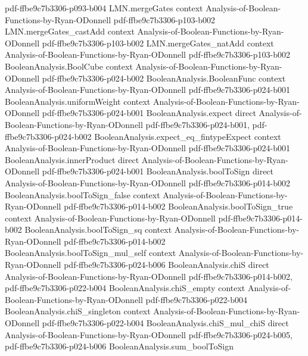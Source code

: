\begin{theorem}
  {pdf-ffbe9c7b3306-p093-b004}
\proofstep
  {LMN.mergeGates}
  {context}
  {Analysis-of-Boolean-Functions-by-Ryan-ODonnell}
  {pdf-ffbe9c7b3306-p103-b002}
\proofstep
  {LMN.mergeGates_castAdd}
  {context}
  {Analysis-of-Boolean-Functions-by-Ryan-ODonnell}
  {pdf-ffbe9c7b3306-p103-b002}
\proofstep
  {LMN.mergeGates_natAdd}
  {context}
  {Analysis-of-Boolean-Functions-by-Ryan-ODonnell}
  {pdf-ffbe9c7b3306-p103-b002}
\proofstep
  {BooleanAnalysis.BoolCube}
  {context}
  {Analysis-of-Boolean-Functions-by-Ryan-ODonnell}
  {pdf-ffbe9c7b3306-p024-b002}
\proofstep
  {BooleanAnalysis.BooleanFunc}
  {context}
  {Analysis-of-Boolean-Functions-by-Ryan-ODonnell}
  {pdf-ffbe9c7b3306-p024-b001}
\proofstep
  {BooleanAnalysis.uniformWeight}
  {context}
  {Analysis-of-Boolean-Functions-by-Ryan-ODonnell}
  {pdf-ffbe9c7b3306-p024-b001}
\proofstep
  {BooleanAnalysis.expect}
  {direct}
  {Analysis-of-Boolean-Functions-by-Ryan-ODonnell}
  {pdf-ffbe9c7b3306-p024-b001,
    pdf-ffbe9c7b3306-p024-b002}
\proofstep
  {BooleanAnalysis.expect_eq_fintypeExpect}
  {context}
  {Analysis-of-Boolean-Functions-by-Ryan-ODonnell}
  {pdf-ffbe9c7b3306-p024-b001}
\proofstep
  {BooleanAnalysis.innerProduct}
  {direct}
  {Analysis-of-Boolean-Functions-by-Ryan-ODonnell}
  {pdf-ffbe9c7b3306-p024-b001}
\proofstep
  {BooleanAnalysis.boolToSign}
  {direct}
  {Analysis-of-Boolean-Functions-by-Ryan-ODonnell}
  {pdf-ffbe9c7b3306-p014-b002}
\proofstep
  {BooleanAnalysis.boolToSign_false}
  {context}
  {Analysis-of-Boolean-Functions-by-Ryan-ODonnell}
  {pdf-ffbe9c7b3306-p014-b002}
\proofstep
  {BooleanAnalysis.boolToSign_true}
  {context}
  {Analysis-of-Boolean-Functions-by-Ryan-ODonnell}
  {pdf-ffbe9c7b3306-p014-b002}
\proofstep
  {BooleanAnalysis.boolToSign_sq}
  {context}
  {Analysis-of-Boolean-Functions-by-Ryan-ODonnell}
  {pdf-ffbe9c7b3306-p014-b002}
\proofstep
  {BooleanAnalysis.boolToSign_mul_self}
  {context}
  {Analysis-of-Boolean-Functions-by-Ryan-ODonnell}
  {pdf-ffbe9c7b3306-p024-b006}
\proofstep
  {BooleanAnalysis.chiS}
  {direct}
  {Analysis-of-Boolean-Functions-by-Ryan-ODonnell}
  {pdf-ffbe9c7b3306-p014-b002,
    pdf-ffbe9c7b3306-p022-b004}
\proofstep
  {BooleanAnalysis.chiS_empty}
  {context}
  {Analysis-of-Boolean-Functions-by-Ryan-ODonnell}
  {pdf-ffbe9c7b3306-p022-b004}
\proofstep
  {BooleanAnalysis.chiS_singleton}
  {context}
  {Analysis-of-Boolean-Functions-by-Ryan-ODonnell}
  {pdf-ffbe9c7b3306-p022-b004}
\proofstep
  {BooleanAnalysis.chiS_mul_chiS}
  {direct}
  {Analysis-of-Boolean-Functions-by-Ryan-ODonnell}
  {pdf-ffbe9c7b3306-p024-b005,
    pdf-ffbe9c7b3306-p024-b006}
\proofstep
  {BooleanAnalysis.sum_boolToSign}

\end{theorem}
